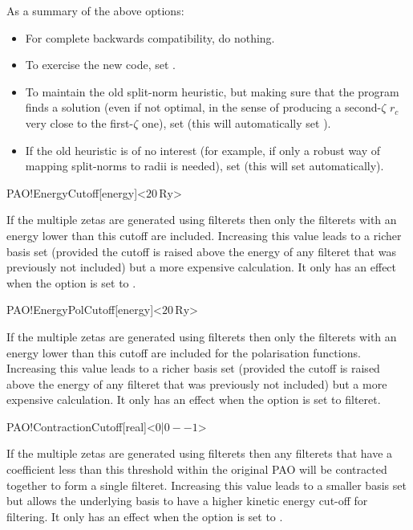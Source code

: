 As a summary of the above options:
\begin{itemize}
  \item%
  For complete backwards compatibility, do nothing.

  \item%
  To exercise the new code, set .
  
  \item%
  To maintain the old split-norm heuristic, but making sure that the
  program finds a solution (even if not optimal, in the sense of
  producing a second-$\zeta$ $r_c$ very close to the first-$\zeta$
  one), set  (this will automatically set
  ).
  
  \item%
  If the old heuristic is of no interest (for example, if only a
  robust way of mapping split-norms to radii is needed), set
   (this will set 
  automatically).

\end{itemize}

\begin{fdfentry}{PAO!EnergyCutoff}[energy]<$20\,\mathrm{Ry}$>

  If the multiple zetas are generated using filterets then only the
  filterets with an energy lower than this cutoff are
  included. Increasing this value leads to a richer basis set
  (provided the cutoff is raised above the energy of any filteret that
  was previously not included) but a more expensive calculation.  It
  only has an effect when the option  is set to
  .
  
\end{fdfentry}

\begin{fdfentry}{PAO!EnergyPolCutoff}[energy]<$20\,\mathrm{Ry}$>

  If the multiple zetas are generated using filterets then only the
  filterets with an energy lower than this cutoff are included for the
  polarisation functions. Increasing this value leads to a richer
  basis set (provided the cutoff is raised above the energy of any
  filteret that was previously not included) but a more expensive
  calculation. It only has an effect when the option
   is set to filteret.

\end{fdfentry}

\begin{fdfentry}{PAO!ContractionCutoff}[real]<$0$|$0--1$>

  If the multiple zetas are generated using filterets then any
  filterets that have a coefficient less than this threshold within
  the original PAO will be contracted together to form a single
  filteret.  Increasing this value leads to a smaller basis set but
  allows the underlying basis to have a higher kinetic energy cut-off
  for filtering. It only has an effect when the option
   is set to .
  
\end{fdfentry}



